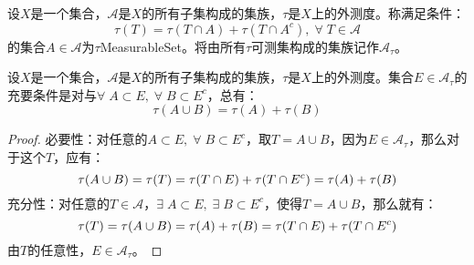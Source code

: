 \begin{definition}
	设$X$是一个集合，$\mathscr{A}$是$X$的所有子集构成的集族，$\tau$是$X$上的外测度。称满足条件：
	\begin{equation*}
		\tau(T)=\tau(T\cap A)+\tau(T\cap A^c),\;\forall\;T\in\mathscr{A}
	\end{equation*}
	的集合$A\in\mathscr{A}$为$\tau$\gls{MeasurableSet}。将由所有$\tau$可测集构成的集族记作$\mathscr{A}_{\tau}$。
\end{definition}
\begin{lemma}\label{lem:EmeasureAB}
	设$X$是一个集合，$\mathscr{A}$是$X$的所有子集构成的集族，$\tau$是$X$上的外测度。集合$E\in \mathscr{A}_{\tau}$的充要条件是对与$\forall\;A\subset E,\;\forall\;B\subset E^c$，总有：
	\begin{equation*}
		\tau(A\cup B)=\tau(A)+\tau(B)
	\end{equation*}
\end{lemma}
\begin{proof}
	必要性：对任意的$A\subset E,\;\forall\;B\subset E^c$，取$T=A\cup B$，因为$E\in \mathscr{A}_{\tau}$，那么对于这个$T$，应有：
	\begin{equation}
		\tau(A\cup B)=\tau(T)=\tau(T\cap E)+\tau(T\cap E^c)=\tau(A)+\tau(B)\notag
	\end{equation}
	充分性：对任意的$T\in \mathscr{A}$，$\exists\;A\subset E,\;\exists\; B\subset E^c$，使得$T=A\cup B$，那么就有：
	\begin{equation}
		\tau(T)=\tau(A\cup B)=\tau(A)+\tau(B)=\tau(T\cap E)+\tau(T\cap E^c)\notag
	\end{equation}
	由$T$的任意性，$E\in \mathscr{A}_{\tau}$。
\end{proof}
